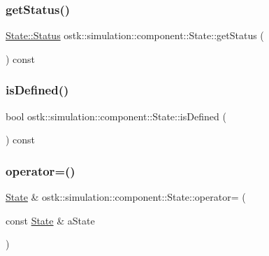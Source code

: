 \subsubsection{\texorpdfstring{get\+Status()}{getStatus()}}
{\footnotesize\ttfamily \hyperlink{classostk_1_1simulation_1_1component_1_1_state_adb8b51feaa29b0ebd5fc7977fada7e58}{State\+::\+Status} ostk\+::simulation\+::component\+::\+State\+::get\+Status (\begin{DoxyParamCaption}{ }\end{DoxyParamCaption}) const}

\mbox{\label{classostk_1_1simulation_1_1component_1_1_state_abfb0349ee570125276b52aa2c3b1156d}} 
\subsubsection{\texorpdfstring{is\+Defined()}{isDefined()}}
{\footnotesize\ttfamily bool ostk\+::simulation\+::component\+::\+State\+::is\+Defined (\begin{DoxyParamCaption}{ }\end{DoxyParamCaption}) const}

\mbox{\label{classostk_1_1simulation_1_1component_1_1_state_ac8aaea99357f670afab3c087de08446f}} 
\subsubsection{\texorpdfstring{operator=()}{operator=()}}
{\footnotesize\ttfamily \hyperlink{classostk_1_1simulation_1_1component_1_1_state}{State} \& ostk\+::simulation\+::component\+::\+State\+::operator= (\begin{DoxyParamCaption}\item[{const \hyperlink{classostk_1_1simulation_1_1component_1_1_state}{State} \&}]{a\+State }\end{DoxyParamCaption})}

